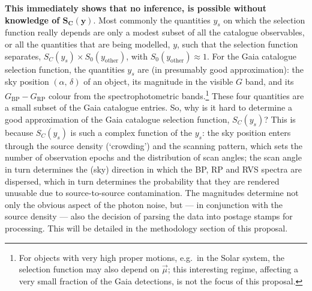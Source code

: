 \textbf{This immediately shows that no inference, is possible without knowledge of $\mathbf{S_C(y)}$}. Most commonly the quantities $y_s$ on which the selection function really depends are only a modest subset of all the catalogue observables, or all the quantities that are being modelled, $y$, such that the selection function separates, $S_C(y_s) \times S_0(y_\mathrm{other})$, with $S_0(y_\mathrm{other})\approx 1$. For the Gaia catalogue selection function, the quantities $y_s$ are (in presumably good approximation): the sky position $(\alpha,\,\delta)$ of an object, its magnitude in the visible $G$ band, and its $G_\mathrm{BP}-G_\mathrm{RP}$ colour from the spectrophotometric bands.\footnote{For objects with very high proper motions, e.g.\ in the Solar system, the selection function may also depend on $\vec{\mu}$; this interesting regime, affecting a very small fraction of the Gaia detections, is not the focus of this proposal.} These four quantities are a small subset of the Gaia catalogue entries. So, why is it hard to determine a good approximation of the Gaia catalogue selection function, $S_C(y_s)$? This is because $S_C(y_s)$ is such a complex function of the $y_s$: the sky position enters through the source density (`crowding') and the scanning pattern, which sets the number of observation epochs and the distribution of scan angles; the scan angle in turn determines the (sky) direction in which the BP, RP and RVS spectra are dispersed, which in turn determines the probability that they are rendered unusable due to source-to-source contamination. The magnitudes determine not only the obvious aspect of the photon noise, but --- in conjunction with the source density --- also the decision of parsing the data into postage stamps for processing. This will be detailed in the methodology section of this proposal.

